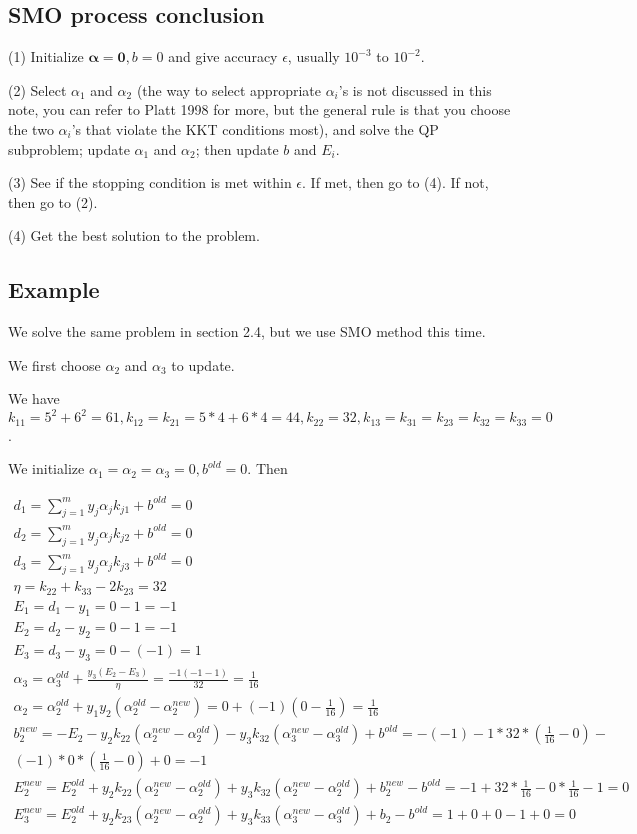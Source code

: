 \documentclass{article}
\begin{document}
\subsection{SMO process conclusion}

\noindent (1) Initialize $\boldsymbol{\alpha} = \boldsymbol{0}, b=0$ and give accuracy $\epsilon$, usually $10^{-3}$ to $10^{-2}$.

\noindent (2) Select $\alpha_1$ and $\alpha_2$ (the way to select appropriate $\alpha_i$'s is not discussed in this note, you can refer to Platt 1998 for more, but the general rule is that you choose the two $\alpha_i$'s that violate the KKT conditions most), and solve the QP subproblem; update $\alpha_1$ and $\alpha_2$; then update $b$ and $E_i$.

\noindent (3) See if the stopping condition is met within $\epsilon$. If met, then go to (4). If not, then go to (2).

\noindent (4) Get the best solution to the problem.

\subsection{Example}

We solve the same problem in section 2.4, but we use SMO method this time.

We first choose $\alpha_2$ and $\alpha_3$ to update.

We have $k_{11} = 5^2 + 6^2 = 61, k_{12} = k_{21} = 5*4 + 6*4 = 44, k_{22} = 32, k_{13} = k_{31} = k_{23} = k_{32} = k_{33} = 0$.

We initialize $\alpha_1 = \alpha_2 = \alpha_3 = 0, b^{old} = 0$.
Then

\begin{gather*}
d_1=\sum_{j=1}^m y_j \alpha_j k_{j 1}+b^{old} = 0\\
d_2=\sum_{j=1}^m y_j \alpha_j k_{j 2}+b^{old} = 0\\
d_3=\sum_{j=1}^m y_j \alpha_j k_{j 3}+b^{old} = 0\\
\eta = k_{22}+k_{33}-2 k_{23} = 32\\
E_1 = d_1 - y_1 = 0-1 = -1\\
E_2 = d_2 - y_2 = 0-1 = -1\\
E_3 = d_3 - y_3 = 0-(-1) = 1\\
\alpha_3 = \alpha_3^{old} + \frac{y_3(E_2-E_3)}{\eta} = \frac{-1(-1-1)}{32} = \frac{1}{16}\\
\alpha_2 = \alpha_2^{old} + y_1y_2(\alpha_2^{old} - \alpha_2^{new}) = 0+(-1)(0-\frac{1}{16}) = \frac{1}{16}\\
b_2^{new} = -E_2 - y_2k_{22}(\alpha_2^{new} - \alpha_2^{old}) - y_3k_{32}(\alpha_3^{new} - \alpha_3^{old}) + b^{old} = -(-1) - 1*32*(\frac{1}{16}-0) - \\
(-1)*0*(\frac{1}{16}-0) + 0 = -1\\
E_2^{new} = E_2^{old} + y_2k_{22}(\alpha_2^{new} - \alpha_2^{old}) + y_3k_{32}(\alpha_2^{new} - \alpha_2^{old}) + b_2^{new}-b^{old} = -1+32*\frac{1}{16}-0*\frac{1}{16}-1 = 0\\
E_3^{new} = E_2^{old} + y_2k_{23}(\alpha_2^{new} - \alpha_2^{old}) + y_3k_{33}(\alpha_3^{new} - \alpha_3^{old}) + b_2-b^{old} = 1+0+0-1+0 = 0
\end{gather*}
\end{document}
